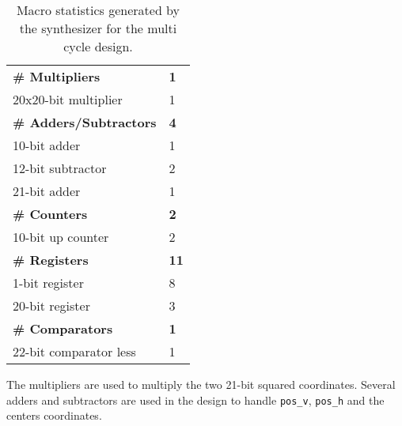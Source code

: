 \documentclass[paper=usletter, fontsize=12pt]{article}
\begin{document}
        \begin{table}[h]
            \caption{Macro statistics generated by the synthesizer for the
            multi cycle design.}
            \label{table:multimacro}
            \centering
            \begin{tabular*}{250pt}{ m{20em}m{1cm} }
                \textbf{\# Multipliers}         & \textbf{1} \\
                 20x20-bit multiplier           & 1 \\
                \textbf{\# Adders/Subtractors}  & \textbf{4} \\
                 10-bit adder                   & 1 \\
                 12-bit subtractor              & 2 \\
                 21-bit adder                   & 1 \\
                \textbf{\# Counters}            & \textbf{2} \\
                 10-bit up counter              & 2 \\
                \textbf{\# Registers}           & \textbf{11} \\
                 1-bit register                 & 8 \\
                 20-bit register                & 3 \\
                \textbf{\# Comparators}         & \textbf{1} \\
                 22-bit comparator less         & 1 \\
            \end{tabular*}

        \end{table}

        The multipliers are used to multiply the two 21-bit squared
        coordinates. Several adders and subtractors are used in the design to
        handle \texttt{pos\_v}, \texttt{pos\_h} and the centers coordinates.
        \newpage
\end{document}

